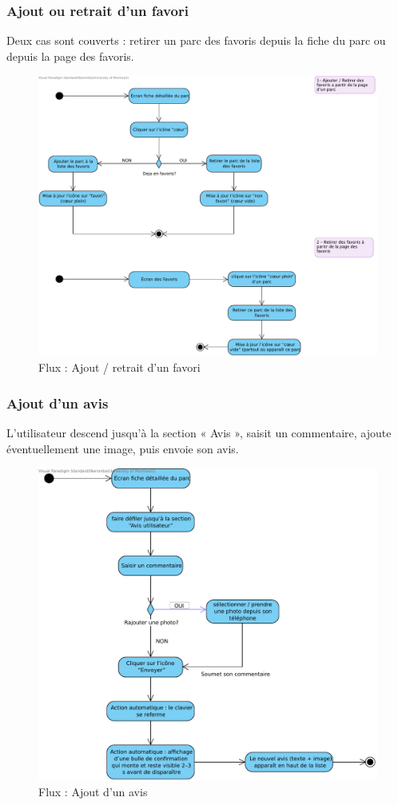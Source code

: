 \documentclass[12pt,a4paper]{article}
\begin{document}
\subsubsection{Ajout ou retrait d'un favori}

Deux cas sont couverts : retirer un parc des favoris depuis la fiche du parc ou depuis la page des favoris.

\begin{figure}[h!]
  \centering
  \includegraphics[width=0.9\linewidth]{attachments/Ajout_retrait_d_un_favori.pdf}
  \caption{Flux : Ajout / retrait d'un favori}
\end{figure}

\subsubsection{Ajout d'un avis}

L'utilisateur descend jusqu'à la section « Avis », saisit un commentaire, ajoute éventuellement une image, puis envoie son avis.

\begin{figure}[h!]
  \centering
  \includegraphics[width=0.9\linewidth]{attachments/Ajouter_un_avis_spot.pdf}
  \caption{Flux : Ajout d'un avis}
\end{figure}
\end{document}
